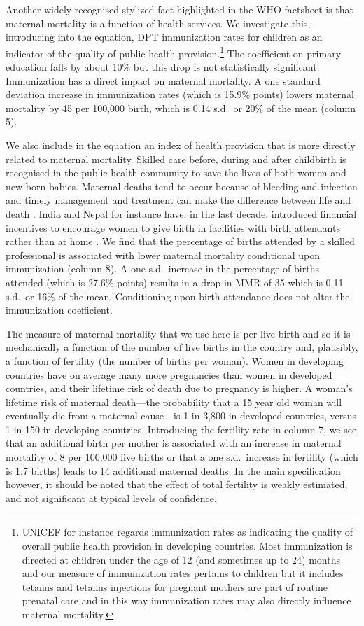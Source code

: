 \documentclass{article}[12pt,subeqn]
\begin{document}
\begin{spacing}{1.4}
Another widely recognised stylized fact highlighted in the WHO factsheet is that 
maternal mortality is a function of health services. We investigate this, 
introducing into the equation, DPT immunization rates for children as an indicator 
of the quality of public health provision.\footnote{UNICEF for instance regards 
immunization rates as indicating the quality of overall public health provision 
in developing countries. Most immunization is directed at children under the age 
of 12 (and sometimes up to 24) months and our measure of immunization rates 
pertains to children but it includes tetanus and tetanus injections for pregnant 
mothers are part of routine prenatal care and in this way immunization rates may
also directly influence maternal mortality.} The coefficient on primary 
education falls by about 10\% but this drop is not statistically 
significant. Immunization has a direct impact on maternal mortality. A one 
standard deviation increase in immunization rates (which is 15.9\% points) lowers 
maternal mortality by 45 per 100,000 birth, which is 0.14 s.d.\ or 20\% of the 
mean (column 5).

We also include in the equation an index of health provision that is more 
directly related to maternal mortality. Skilled care before, during and after 
childbirth is recognised in the public health community to save the lives of both 
women and new-born babies. Maternal deaths tend to occur because of bleeding and
infection and timely management and treatment can make the difference between life 
and death \citep{WHO2012}. India and Nepal for instance have, in the last decade, 
introduced financial incentives to encourage women to give birth in facilities 
with birth attendants rather than at home \citep{Milleretal2012,
PowellJacksonHanson2012}. We find that the percentage of births attended by a 
skilled professional is associated with lower maternal mortality conditional upon 
immunization (column 8). A one s.d.\ increase in the percentage of births attended 
(which is 27.6\% points) results in a drop in MMR of 35 which is 0.11 s.d.\ or 16\% 
of the mean. Conditioning upon birth attendance does not alter the immunization 
coefficient.

The measure of maternal mortality that we use here is per live birth and so it is 
mechanically a function of the number of live births in the country and, plausibly, 
a function of fertility (the number of births per woman). Women in developing 
countries have on average many more pregnancies than women in developed countries, 
and their lifetime risk of death due to pregnancy is higher. A woman's lifetime 
risk of maternal death---the probability that a 15 year old woman will eventually 
die from a maternal cause---is 1 in 3,800 in developed countries, versus 1 in 150 
in developing countries. Introducing the fertility rate in column 7, we see that an 
additional birth per mother is associated with an increase in maternal mortality of
8 per 100,000 live births or that a one s.d.\ increase in fertility (which is 1.7
births) leads to 14 additional maternal deaths. In the main specification however,
it should be noted that the effect of total fertility is weakly estimated, and not
significant at typical levels of confidence.


\end{spacing}
\end{document}
